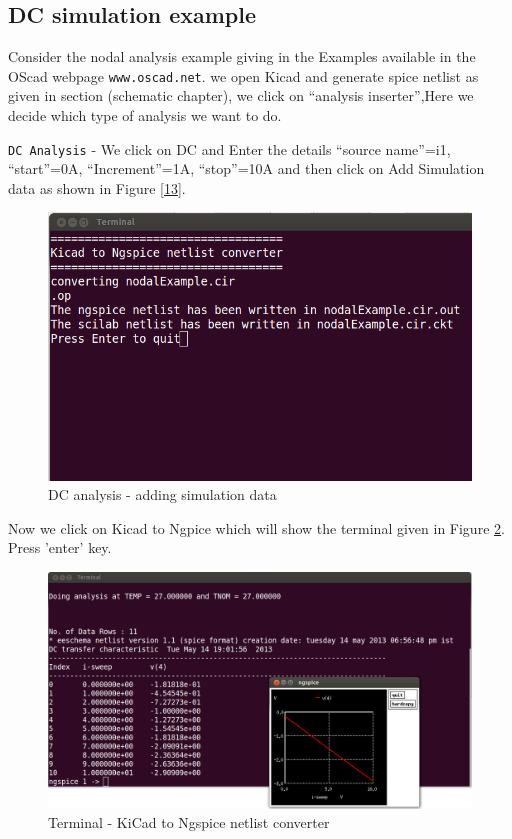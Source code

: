 \subsection{DC simulation example}
\label{dc}
Consider the nodal analysis example giving in the Examples available in the OScad webpage {\tt www.oscad.net}.  we  open Kicad and generate spice netlist as given in section (schematic chapter), we click on “analysis inserter”,Here we decide which type of analysis we want to do.

{\tt DC Analysis} -  We click on DC  and Enter the details “source name”=i1, “start”=0A, “Increment”=1A, “stop”=10A and then click on Add Simulation data as shown in Figure \ref{13}.
\begin{figure}
\centering
\includegraphics[width=\textwidth]{figures/13}
\caption{DC analysis - adding simulation data}
\label{12}
\end{figure}
Now we click on Kicad to Ngpice which will show the  terminal given in Figure \ref{14}. Press 'enter' key.
\begin{figure}
\centering
\includegraphics[width=\textwidth]{figures/14}
\caption{Terminal - KiCad to Ngspice netlist converter}
\label{14}
\end{figure}
